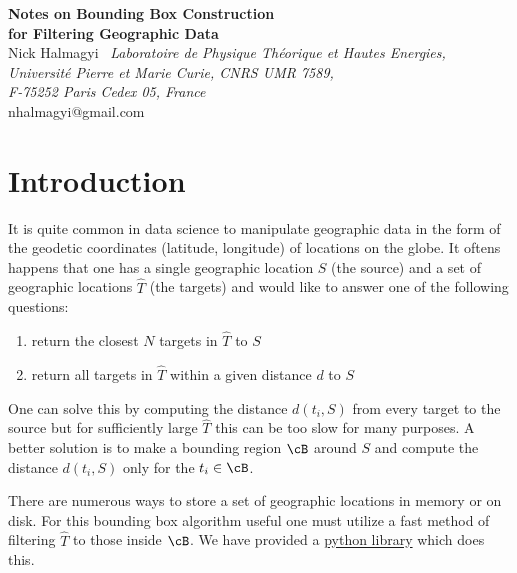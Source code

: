 \documentclass[preprint,12pt]{article}
\begin{document}

\begin{center}
\end{center}

\vspace{0.5cm}
\begin{center}
\baselineskip=13pt {\LARGE \bf{Notes on Bounding Box Construction \\
for Filtering Geographic Data}\\}
 \vskip1.5cm 
Nick Halmagyi\ 
 \vskip0.5cm
\textit{Laboratoire de Physique Th\'eorique et Hautes Energies,\\
Universit\'e Pierre et Marie Curie, CNRS UMR 7589, \\
F-75252 Paris Cedex 05, France}\\
\vskip0.5cm
nhalmagyi@gmail.com \\
\end{center}

\section{Introduction}

It is quite common in data science to manipulate geographic data in the form of the geodetic coordinates (latitude, longitude) of locations on the globe. It oftens happens that one has a single geographic location $S$ (the  source) and a set of geographic locations $\widehat{T}$ (the targets) and would like to answer one of the following questions:
\begin{enumerate}
\item return the closest $N$ targets in  $\widehat{T}$ to $S$
\item return all targets in $\widehat{T}$ within a given distance $d$ to $S$
\end{enumerate}
One can solve this by computing the distance $d(t_i, S)$ from every target to the source but for sufficiently large  $\widehat{T}$ this can be too slow for many purposes. A better solution is to make a bounding region $\cB$ around $S$ and compute the distance  $d(t_i,S)$ only for the $t_i \in \cB$. 

There are numerous ways to store a set of geographic locations in memory or on disk. For this bounding box algorithm useful one must utilize a fast method of filtering $\widehat{T}$ to those inside $\cB$. We have provided a \href{https://github.com/nickhalmagyi/BoundingBox}{python library} which does this. 
\end{document}
